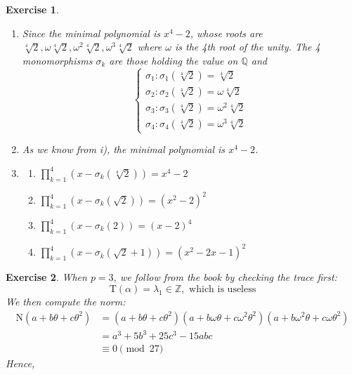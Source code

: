 \documentclass{article}
\theoremstyle{breakstyle}
\newtheorem{exercise}{Exercise}[section]
\begin{document}
\begin{exercise}
    \leavevmode \vspace{-\baselineskip}
    \begin{enumerate}[label=\roman*.]
        \item Since the minimal polynomial is $x^4 - 2$, whose roots are $\sqrt[4]{2}, \omega\sqrt[4]{2}, \omega^2\sqrt[4]{2}, \omega^3\sqrt[4]{2}$ where $\omega$ is the 4th root of the unity. The 4 monomorphisms $\sigma_k$ are those holding the value on $\mathbb{Q}$ and
        \[ 
            \begin{cases}
                \sigma_1 : \sigma_1(\sqrt[4]{2}) = \sqrt[4]{2} \\
                \sigma_2 : \sigma_2(\sqrt[4]{2}) = \omega\sqrt[4]{2} \\
                \sigma_3 : \sigma_3(\sqrt[4]{2}) = \omega^2\sqrt[4]{2} \\
                \sigma_4 : \sigma_4(\sqrt[4]{2}) = \omega^3\sqrt[4]{2}
            \end{cases} 
        \]
        \item As we know from \emph{i)}, the minimal polynomial is $x^4 - 2$.
        \item
        \begin{enumerate}[label=\alph*)]
            \item $\prod_{k=1}^4 (x - \sigma_k(\sqrt[4]{2})) = x^4 - 2$
            \item $\prod_{k=1}^4 (x - \sigma_k(\sqrt{2})) = (x^2 - 2)^2$
            \item $\prod_{k=1}^4 (x - \sigma_k(2)) = (x - 2)^4$
            \item $\prod_{k=1}^4 (x - \sigma_k(\sqrt{2} + 1)) = (x^2 - 2x - 1)^2$
        \end{enumerate}
    \end{enumerate}
\end{exercise}

\begin{exercise}
    When $p = 3$, we follow from the book by checking the trace first:
    \[ 
        \mathrm{T}(\alpha) = \lambda_1 \in \mathbb{Z}, \text{ which is useless} 
    \]
    We then compute the norm:
    \begin{align*}
        \mathrm{N}(a + b\theta + c\theta^2) &= (a + b\theta + c\theta^2)(a + b\omega\theta + c\omega^2\theta^2)(a + b\omega^2\theta + c\omega\theta^2) \\
        &= a^3 + 5b^3 + 25c^3 - 15abc \\
        &\equiv 0 \pmod{27}
    \end{align*}
    Hence,
\end{exercise}
\end{document}
